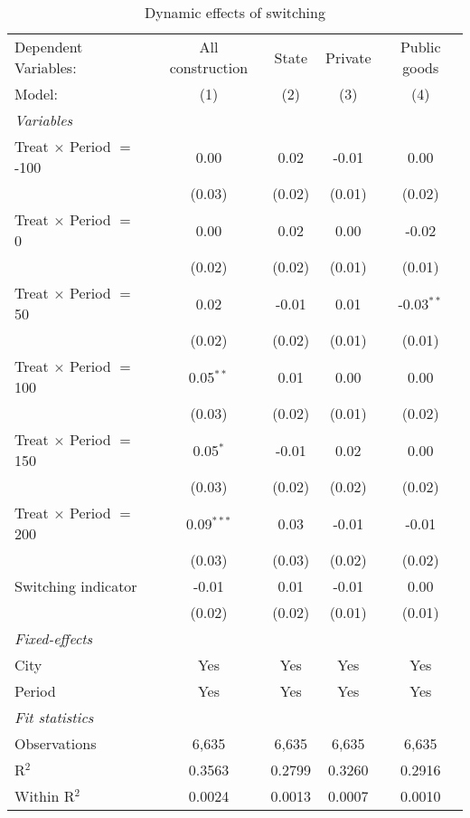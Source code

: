 \begin{table}[htbp]
   \caption{\label{tab:SW22_replication_50y} Dynamic effects of switching}
   \centering
   \begin{tabular}{lcccc}
      \tabularnewline \midrule \midrule
      Dependent Variables:            & All construction & State  & Private & Public goods\\  
      Model:                          & (1)              & (2)    & (3)     & (4)\\  
      \midrule
      \emph{Variables}\\
      Treat $\times$ Period $=$ -100  & 0.00             & 0.02   & -0.01   & 0.00\\   
                                      & (0.03)           & (0.02) & (0.01)  & (0.02)\\   
      Treat $\times$ Period $=$ 0     & 0.00             & 0.02   & 0.00    & -0.02\\   
                                      & (0.02)           & (0.02) & (0.01)  & (0.01)\\   
      Treat $\times$ Period $=$ 50    & 0.02             & -0.01  & 0.01    & -0.03$^{**}$\\   
                                      & (0.02)           & (0.02) & (0.01)  & (0.01)\\   
      Treat $\times$ Period $=$ 100   & 0.05$^{**}$      & 0.01   & 0.00    & 0.00\\   
                                      & (0.03)           & (0.02) & (0.01)  & (0.02)\\   
      Treat $\times$ Period $=$ 150   & 0.05$^{*}$       & -0.01  & 0.02    & 0.00\\   
                                      & (0.03)           & (0.02) & (0.02)  & (0.02)\\   
      Treat $\times$ Period $=$ 200   & 0.09$^{***}$     & 0.03   & -0.01   & -0.01\\   
                                      & (0.03)           & (0.03) & (0.02)  & (0.02)\\   
      Switching indicator             & -0.01            & 0.01   & -0.01   & 0.00\\   
                                      & (0.02)           & (0.02) & (0.01)  & (0.01)\\   
      \midrule
      \emph{Fixed-effects}\\
      City                            & Yes              & Yes    & Yes     & Yes\\  
      Period                          & Yes              & Yes    & Yes     & Yes\\  
      \midrule
      \emph{Fit statistics}\\
      Observations                    & 6,635            & 6,635  & 6,635   & 6,635\\  
      R$^2$                           & 0.3563           & 0.2799 & 0.3260  & 0.2916\\  
      Within R$^2$                    & 0.0024           & 0.0013 & 0.0007  & 0.0010\\  
      \midrule \midrule
      

\end{tabular}
\end{table}
